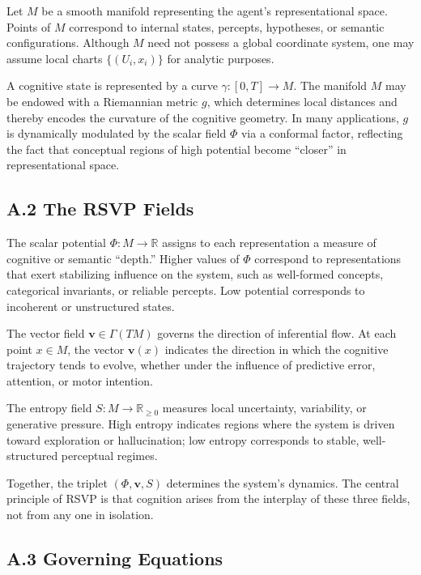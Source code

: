 \documentclass[12pt]{article}
\begin{document}
Let $M$ be a smooth manifold representing the agent’s representational space.  
Points of $M$ correspond to internal states, percepts, hypotheses, or semantic 
configurations. Although $M$ need not possess a global coordinate system, one 
may assume local charts $\{(U_i, x_i)\}$ for analytic purposes. 

A cognitive state is represented by a curve $\gamma : [0,T] \to M$. The 
manifold $M$ may be endowed with a Riemannian metric $g$, which determines 
local distances and thereby encodes the curvature of the cognitive geometry.  
In many applications, $g$ is dynamically modulated by the scalar field $\Phi$ 
via a conformal factor, reflecting the fact that conceptual regions of high 
potential become “closer” in representational space.

\subsection*{A.2 The RSVP Fields}

The scalar potential $\Phi : M \to \mathbb{R}$ assigns to each representation a 
measure of cognitive or semantic “depth.” Higher values of $\Phi$ correspond to 
representations that exert stabilizing influence on the system, such as 
well-formed concepts, categorical invariants, or reliable percepts. Low 
potential corresponds to incoherent or unstructured states.

The vector field $\mathbf{v} \in \Gamma(TM)$ governs the direction of 
inferential flow. At each point $x \in M$, the vector $\mathbf{v}(x)$ indicates 
the direction in which the cognitive trajectory tends to evolve, whether under 
the influence of predictive error, attention, or motor intention.

The entropy field $S : M \to \mathbb{R}_{\ge 0}$ measures local uncertainty, 
variability, or generative pressure. High entropy indicates regions where the 
system is driven toward exploration or hallucination; low entropy corresponds 
to stable, well-structured perceptual regimes.

Together, the triplet $(\Phi, \mathbf{v}, S)$ determines the system’s 
dynamics. The central principle of RSVP is that cognition arises from the 
interplay of these three fields, not from any one in isolation.

\subsection*{A.3 Governing Equations}
\end{document}

